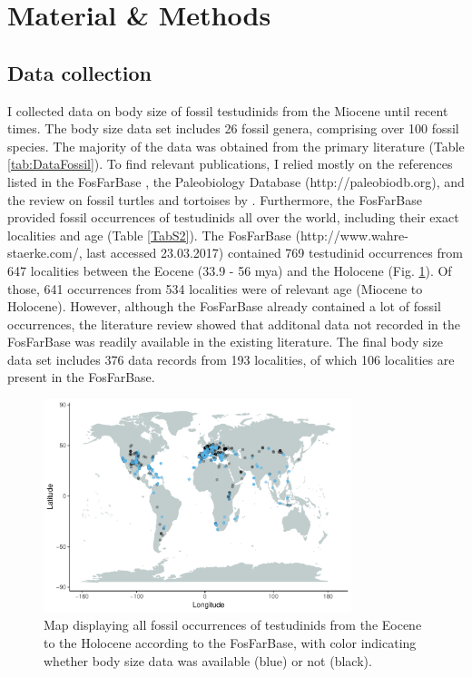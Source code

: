 \section{Material \& Methods}

\subsection{Data collection}
I collected data on body size of fossil testudinids from the Miocene until recent times. The body size data set includes 26 fossil genera, comprising over 100 fossil species. The majority of the data was obtained from the primary literature (Table \ref{tab:DataFossil}). To find relevant publications, I relied mostly on the references listed in the FosFarBase \citep{Bohme2003b}, the Paleobiology Database (http://paleobiodb.org), and the review on fossil turtles and tortoises by \cite{rhodin2015turtles}.
Furthermore, the FosFarBase provided fossil occurrences of testudinids all over the world, including their exact localities and age (Table \ref{TabS2}). The FosFarBase (http://www.wahre-staerke.com/, last accessed 23.03.2017) contained 769 testudinid occurrences from 647 localities between the Eocene (33.9 - 56 mya) and the Holocene (Fig. \ref{fig:mapOc}). Of those, 641 occurrences from 534 localities were of relevant age (Miocene to Holocene). However, although the FosFarBase already contained a lot of fossil occurrences, the literature review showed that additonal data not recorded in the FosFarBase was readily available in the existing literature. 
The final body size data set includes 376 data records from 193 localities, of which 106 localities are present in the FosFarBase.


 \begin{figure}[htbp]
 	\centering
 	\includegraphics[width=0.8\textwidth]{MA_JJ_files/figure-latex/MapFossilOccurrences-1.pdf}
 	\caption[Map: fossil occurrences]{Map displaying all fossil occurrences of testudinids from the Eocene to the Holocene according to the FosFarBase, with
 		color indicating whether body size data was available (blue) or not (black).}
 	\label{fig:mapOc}
 \end{figure}

